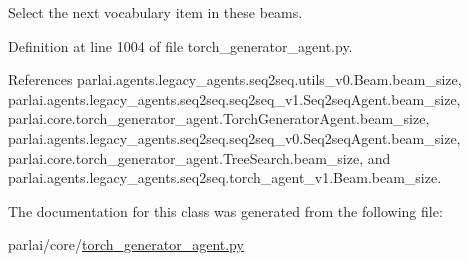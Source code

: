\begin{DoxyVerb}Select the next vocabulary item in these beams.\end{DoxyVerb}
 

Definition at line 1004 of file torch\+\_\+generator\+\_\+agent.\+py.



References parlai.\+agents.\+legacy\+\_\+agents.\+seq2seq.\+utils\+\_\+v0.\+Beam.\+beam\+\_\+size, parlai.\+agents.\+legacy\+\_\+agents.\+seq2seq.\+seq2seq\+\_\+v1.\+Seq2seq\+Agent.\+beam\+\_\+size, parlai.\+core.\+torch\+\_\+generator\+\_\+agent.\+Torch\+Generator\+Agent.\+beam\+\_\+size, parlai.\+agents.\+legacy\+\_\+agents.\+seq2seq.\+seq2seq\+\_\+v0.\+Seq2seq\+Agent.\+beam\+\_\+size, parlai.\+core.\+torch\+\_\+generator\+\_\+agent.\+Tree\+Search.\+beam\+\_\+size, and parlai.\+agents.\+legacy\+\_\+agents.\+seq2seq.\+torch\+\_\+agent\+\_\+v1.\+Beam.\+beam\+\_\+size.



The documentation for this class was generated from the following file\+:\begin{DoxyCompactItemize}
\item 
parlai/core/\hyperlink{torch__generator__agent_8py}{torch\+\_\+generator\+\_\+agent.\+py}\end{DoxyCompactItemize}
